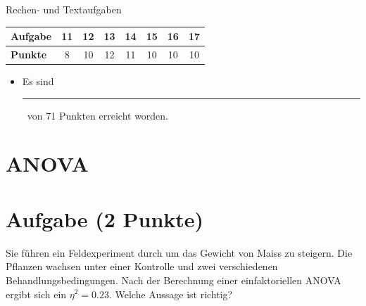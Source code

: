 \documentclass[a4paper, 9pt]{scrartcl}\usepackage[]{graphicx}\usepackage[]{xcolor}
\begin{document}
\begin{graybox}{Rechen- und Textaufgaben}
  \begin{center}
    \large
    \begin{tabular}{|l|c|c|c|c|c|c|c|}
      \hline
      \textbf{Aufgabe} & 11 & 12 & 13 & 14 & 15 & 16 & 17 \strut\\
      \hline
      \textbf{Punkte} & 
      \hspace{1Ex}\Large\textcolor{gray!70}{8}\hspace{1Ex}  & 
      \hspace{1Ex}\Large\textcolor{gray!70}{10}\hspace{1Ex}  & 
      \hspace{1Ex}\Large\textcolor{gray!70}{12}\hspace{1Ex}  & 
      \hspace{1Ex}\Large\textcolor{gray!70}{11}\hspace{1Ex}  & 
      \hspace{1Ex}\Large\textcolor{gray!70}{10}\hspace{1Ex}  & 
      \hspace{1Ex}\Large\textcolor{gray!70}{10}\hspace{1Ex}  & 
      \hspace{1Ex}\Large\textcolor{gray!70}{10}\hspace{1Ex} \strut\\
      \hline
  \end{tabular}
\end{center}
\begin{itemize}
\item Es sind \rule[0ex]{2em}{.4pt}\, von 71 Punkten erreicht worden.
\end{itemize}
\end{graybox}

\clearpage

\section*{ANOVA}

\section{Aufgabe \hfill (2 Punkte)}



Sie f{\"u}hren ein Feldexperiment durch um das Gewicht von Maiss zu
steigern. Die Pflanzen wachsen unter einer Kontrolle und zwei verschiedenen
Behandlungsbedingungen. Nach der Berechnung einer einfaktoriellen ANOVA
ergibt sich ein $\eta^2 = 0.23$. Welche Aussage ist richtig?
\end{document}
